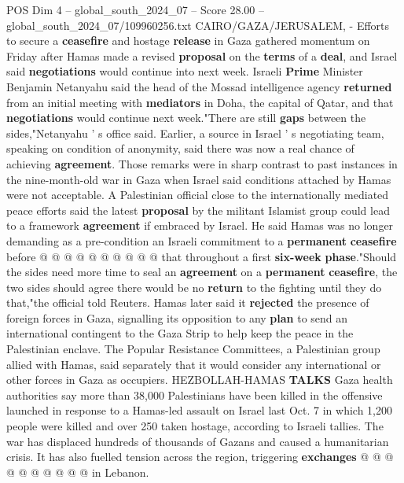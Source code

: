 \begin{textsample}{POS Dim 4 – global\_south\_2024\_07 – Score 28.00 – global\_south\_2024\_07/109960256.txt}  \label{ex:f4_pos_111}
CAIRO/GAZA/JERUSALEM, - Efforts to secure a \textbf{ceasefire} and hostage \textbf{release} in Gaza gathered momentum on Friday after Hamas made a revised \textbf{proposal} on the \textbf{terms} of a \textbf{deal}, and Israel said \textbf{negotiations} would continue into next week.
Israeli \textbf{Prime} Minister Benjamin Netanyahu said the head of the Mossad intelligence agency \textbf{returned} from an initial meeting with \textbf{mediators} in Doha, the capital of Qatar, and that \textbf{negotiations} would continue next week."There are still \textbf{gaps} between the sides,"Netanyahu ' s office said.
Earlier, a source in Israel ' s negotiating team, speaking on condition of anonymity, said there was now a real chance of achieving \textbf{agreement}.
Those remarks were in sharp contrast to past instances in the nine-month-old war in Gaza when Israel said conditions attached by Hamas were not acceptable.
A Palestinian official close to the internationally mediated peace efforts said the latest \textbf{proposal} by the militant Islamist group could lead to a framework \textbf{agreement} if embraced by Israel.
He said Hamas was no longer demanding as a pre-condition an Israeli commitment to a \textbf{permanent} \textbf{ceasefire} before @ @ @ @ @ @ @ @ @ @ that throughout a first \textbf{six-week} \textbf{phase}."Should the sides need more time to seal an \textbf{agreement} on a \textbf{permanent} \textbf{ceasefire}, the two sides should agree there would be no \textbf{return} to the fighting until they do that,"the official told Reuters.
Hamas later said it \textbf{rejected} the presence of foreign forces in Gaza, signalling its opposition to any \textbf{plan} to send an international contingent to the Gaza Strip to help keep the peace in the Palestinian enclave.
The Popular Resistance Committees, a Palestinian group allied with Hamas, said separately that it would consider any international or other forces in Gaza as occupiers.
HEZBOLLAH-HAMAS \textbf{TALKS} Gaza health authorities say more than 38,000 Palestinians have been killed in the offensive launched in response to a Hamas-led assault on Israel last Oct. 7 in which 1,200 people were killed and over 250 taken hostage, according to Israeli tallies.
The war has displaced hundreds of thousands of Gazans and caused a humanitarian crisis.
It has also fuelled tension across the region, triggering \textbf{exchanges} @ @ @ @ @ @ @ @ @ @ in Lebanon.

\end{textsample}
